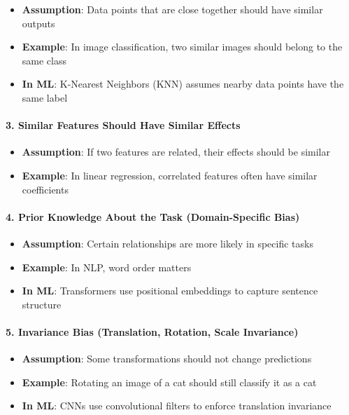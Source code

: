 \begin{itemize}
\item \textbf{Assumption}: Data points that are close together should have similar outputs
\item \textbf{Example}: In image classification, two similar images should belong to the same class
\item \textbf{In ML}: K-Nearest Neighbors (KNN) assumes nearby data points have the same label
\end{itemize}

\paragraph{3. Similar Features Should Have Similar Effects}

\begin{itemize}
\item \textbf{Assumption}: If two features are related, their effects should be similar
\item \textbf{Example}: In linear regression, correlated features often have similar coefficients
\end{itemize}

\paragraph{4. Prior Knowledge About the Task (Domain-Specific Bias)}

\begin{itemize}
\item \textbf{Assumption}: Certain relationships are more likely in specific tasks
\item \textbf{Example}: In NLP, word order matters
\item \textbf{In ML}: Transformers use positional embeddings to capture sentence structure
\end{itemize}

\paragraph{5. Invariance Bias (Translation, Rotation, Scale Invariance)}

\begin{itemize}
\item \textbf{Assumption}: Some transformations should not change predictions
\item \textbf{Example}: Rotating an image of a cat should still classify it as a cat
\item \textbf{In ML}: CNNs use convolutional filters to enforce translation invariance
\end{itemize}

